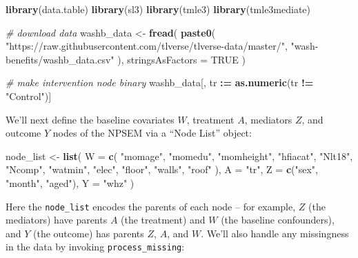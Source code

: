 \documentclass[12pt, krantz2,]{krantz}
\newenvironment{Shaded}{\begin{snugshade}}{\end{snugshade}}
\newcommand{\CommentTok}[1]{\textcolor[rgb]{0.37,0.37,0.37}{\textit{#1}}}
\newcommand{\DataTypeTok}[1]{\textcolor[rgb]{0.27,0.27,0.27}{#1}}
\newcommand{\ErrorTok}[1]{\textcolor[rgb]{0.14,0.14,0.14}{\textbf{#1}}}
\newcommand{\KeywordTok}[1]{\textcolor[rgb]{0.27,0.27,0.27}{\textbf{#1}}}
\newcommand{\NormalTok}[1]{#1}
\newcommand{\OperatorTok}[1]{\textcolor[rgb]{0.43,0.43,0.43}{\textbf{#1}}}
\newcommand{\OtherTok}[1]{\textcolor[rgb]{0.37,0.37,0.37}{#1}}
\newcommand{\StringTok}[1]{\textcolor[rgb]{0.5,0.5,0.5}{#1}}
\theoremstyle{definition}
\theoremstyle{definition}
\theoremstyle{definition}
\newcommand{\1}{\mathbbm{1}}
\begin{document}
\begin{Shaded}
\begin{Highlighting}[]
\KeywordTok{library}\NormalTok{(data.table)}
\KeywordTok{library}\NormalTok{(sl3)}
\KeywordTok{library}\NormalTok{(tmle3)}
\KeywordTok{library}\NormalTok{(tmle3mediate)}

\CommentTok{# download data}
\NormalTok{washb_data <-}\StringTok{ }\KeywordTok{fread}\NormalTok{(}
  \KeywordTok{paste0}\NormalTok{(}
    \StringTok{"https://raw.githubusercontent.com/tlverse/tlverse-data/master/"}\NormalTok{,}
    \StringTok{"wash-benefits/washb_data.csv"}
\NormalTok{  ),}
  \DataTypeTok{stringsAsFactors =} \OtherTok{TRUE}
\NormalTok{)}

\CommentTok{# make intervention node binary}
\NormalTok{washb_data[, tr }\OperatorTok{:}\ErrorTok{=}\StringTok{ }\KeywordTok{as.numeric}\NormalTok{(tr }\OperatorTok{!=}\StringTok{ "Control"}\NormalTok{)]}
\end{Highlighting}
\end{Shaded}

We'll next define the baseline covariates \(W\), treatment \(A\), mediators \(Z\),
and outcome \(Y\) nodes of the NPSEM via a ``Node List'' object:

\begin{Shaded}
\begin{Highlighting}[]
\NormalTok{node_list <-}\StringTok{ }\KeywordTok{list}\NormalTok{(}
  \DataTypeTok{W =} \KeywordTok{c}\NormalTok{(}
    \StringTok{"momage"}\NormalTok{, }\StringTok{"momedu"}\NormalTok{, }\StringTok{"momheight"}\NormalTok{, }\StringTok{"hfiacat"}\NormalTok{, }\StringTok{"Nlt18"}\NormalTok{, }\StringTok{"Ncomp"}\NormalTok{, }\StringTok{"watmin"}\NormalTok{,}
    \StringTok{"elec"}\NormalTok{, }\StringTok{"floor"}\NormalTok{, }\StringTok{"walls"}\NormalTok{, }\StringTok{"roof"}
\NormalTok{  ),}
  \DataTypeTok{A =} \StringTok{"tr"}\NormalTok{,}
  \DataTypeTok{Z =} \KeywordTok{c}\NormalTok{(}\StringTok{"sex"}\NormalTok{, }\StringTok{"month"}\NormalTok{, }\StringTok{"aged"}\NormalTok{),}
  \DataTypeTok{Y =} \StringTok{"whz"}
\NormalTok{)}
\end{Highlighting}
\end{Shaded}

Here the \texttt{node\_list} encodes the parents of each node -- for example, \(Z\) (the
mediators) have parents \(A\) (the treatment) and \(W\) (the baseline confounders),
and \(Y\) (the outcome) has parents \(Z\), \(A\), and \(W\). We'll also handle any
missingness in the data by invoking \texttt{process\_missing}:
\end{document}
